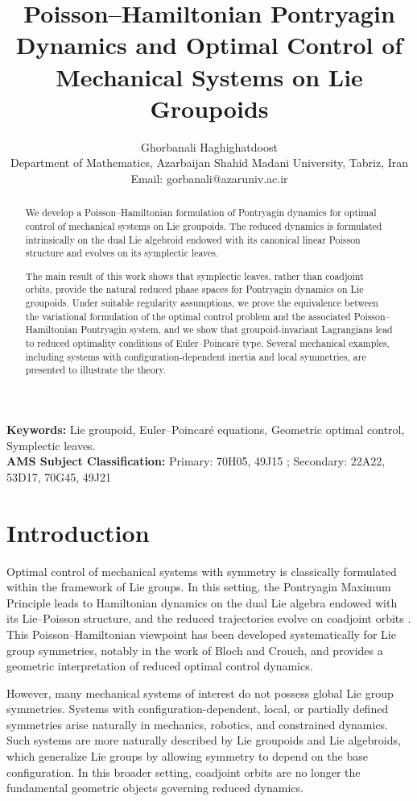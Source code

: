 \documentclass{article}
\title{Poisson–Hamiltonian Pontryagin Dynamics and Optimal Control of Mechanical Systems on Lie Groupoids}
\author{Ghorbanali Haghighatdoost \\
Department of Mathematics, Azarbaijan Shahid Madani University, Tabriz, Iran \\
Email: gorbanali@azaruniv.ac.ir}
\begin{document}
\maketitle
\begin{abstract}
We develop a Poisson--Hamiltonian formulation of Pontryagin dynamics for optimal control of mechanical systems on Lie groupoids. 
The reduced dynamics is formulated intrinsically on the dual Lie algebroid endowed with its canonical linear Poisson structure and evolves on its symplectic leaves. 

The main result of this work shows that symplectic leaves, rather than coadjoint orbits, provide the natural reduced phase spaces for Pontryagin dynamics on Lie groupoids.
Under suitable regularity assumptions, we prove the equivalence between the variational formulation of the optimal control problem and the associated Poisson--Hamiltonian Pontryagin system, and we show that groupoid-invariant Lagrangians lead to reduced optimality conditions of Euler--Poincar\'e type. 
Several mechanical examples, including systems with configuration-dependent inertia and local symmetries, are presented to illustrate the theory.
\end{abstract}


\textbf{Keywords:} Lie groupoid, Euler--Poincar\'e equations, Geometric optimal control, Symplectic leaves. \\

\textbf{AMS Subject Classification:} Primary: 70H05, 49J15 ; Secondary: 22A22, 53D17, 70G45, 49J21



\section{Introduction}

Optimal control of mechanical systems with symmetry is classically formulated within the framework of Lie groups.
In this setting, the Pontryagin Maximum Principle leads to Hamiltonian dynamics on the dual Lie algebra endowed with its Lie--Poisson structure, and the reduced trajectories evolve on coadjoint orbits \cite{Kirillov2004, Vaisman1994, Weinstein1983, HaghighatdoostAyoubiCoadjoint}.
This Poisson--Hamiltonian viewpoint has been developed systematically for Lie group symmetries, notably in the work of Bloch and Crouch, and provides a geometric interpretation of reduced optimal control dynamics.\cite{BlochCrouch1999, Bloch,  BulloLewis, Hagh}

However, many mechanical systems of interest do not possess global Lie group symmetries. 
Systems with configuration-dependent, local, or partially defined symmetries arise naturally in mechanics, robotics, and constrained dynamics. 
Such systems are more naturally described by Lie groupoids and Lie algebroids, which generalize Lie groups by allowing symmetry to depend on the base configuration. 
In this broader setting, coadjoint orbits are no longer the fundamental geometric objects governing reduced dynamics.
\end{document}
